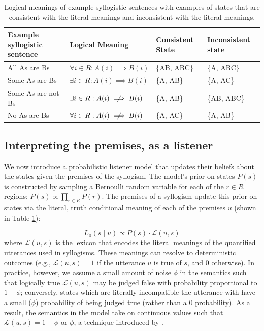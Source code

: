 \documentclass[floatsintext, man]{apa6}
\begin{document}
\begin{table}[b]
\begin{tabular}{@{}llll@{}}
\toprule
Example syllogistic sentence & Logical Meaning                                                                       & Consistent State & Inconsistent state \\ \midrule
All As are Bs                                      & $\forall i \in R: A(i) \implies B(i) $ & \{AB, ABC\}                           & \{A, ABC\}                              \\
Some As are Bs                                     & $\exists i \in R: A(i) \implies B(i) $ & \{A, AB\}                             & \{A, AC\}                               \\
Some As are not Bs                                 & $\exists i \in R: A(i)  \centernot \implies B(i) $ & \{A, AB\}                             & \{AB, ABC\}                             \\
No As are Bs                                       & $\forall i \in R: A(i) \centernot \implies B(i) $  & \{A, AC\}                             & \{A, AB\} \\ \bottomrule
\end{tabular}
\caption{Logical meanings of example syllogistic sentences with examples of states that are consistent with the literal meanings and inconsistent with the literal meanings.}
\label{tab:sem}
\end{table}

\subsection{Interpreting the premises, as a listener}

We now introduce a probabilistic listener model that updates their beliefs about the states given the premises of the syllogism. 
The model's prior on states $P(s)$ is constructed by sampling a Bernoulli random variable for each of the $r \in R$ regions: $P(s) \propto \prod_{r \in R} P(r)$. 
The premises of a syllogism update this prior on states via the literal, truth conditional meaning of each of the premises $u$ (shown in Table \ref{tab:sem}):

\begin{equation}
L_0(s \mid u ) \propto P(s)\cdot \mathcal{L}(u, s) 
\label{eq:L0}
\end{equation}
\noindent where $\mathcal{L}(u, s)$ is the lexicon that encodes the literal meanings of the quantified utterances used in syllogisms. 
These meanings can resolve to deterministic outcomes (e.g., $\mathcal{L}(u, s) = 1$ if the utterance $u$ is true of $s$, and 0 otherwise). 
In practice, however, we assume a small amount of noise $\phi$ in the semantics such that logically true $\mathcal{L}(u, s)$ may be judged false with probability proportional to $1-\phi$; conversely, states which are literally incompatible the utterance with have a small ($\phi$) probability of being judged true (rather than a 0 probability).
As a result, the semantics in the model take on continuous values such that $\mathcal{L}(u, s) = 1-\phi$ or $\phi$, a technique introduced by .
\end{document}
